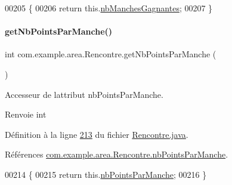\begin{DoxyCode}
00205     \{
00206         \textcolor{keywordflow}{return} this.\hyperlink{classcom_1_1example_1_1area_1_1_rencontre_aef266bd256aecd70fbd02cf07625ed14}{nbManchesGagnantes};
00207     \}
\end{DoxyCode}
\mbox{\label{classcom_1_1example_1_1area_1_1_rencontre_a539e26b8c59998880fcf9b7c9f2b685a}} 
\paragraph{\texorpdfstring{get\+Nb\+Points\+Par\+Manche()}{getNbPointsParManche()}}
{\footnotesize\ttfamily int com.\+example.\+area.\+Rencontre.\+get\+Nb\+Points\+Par\+Manche (\begin{DoxyParamCaption}{ }\end{DoxyParamCaption})}



Accesseur de l\textquotesingle{}attribut nb\+Points\+Par\+Manche. 

\begin{DoxyReturn}{Renvoie}
int 
\end{DoxyReturn}


Définition à la ligne \hyperlink{_rencontre_8java_source_l00213}{213} du fichier \hyperlink{_rencontre_8java_source}{Rencontre.\+java}.



Références \hyperlink{_rencontre_8java_source_l00027}{com.\+example.\+area.\+Rencontre.\+nb\+Points\+Par\+Manche}.


\begin{DoxyCode}
00214     \{
00215         \textcolor{keywordflow}{return} this.\hyperlink{classcom_1_1example_1_1area_1_1_rencontre_ae1849c4bcdcfbb2d336b750a36be1162}{nbPointsParManche};
00216     \}
\end{DoxyCode}
\mbox{\label{classcom_1_1example_1_1area_1_1_rencontre_a58b62bd2f8a63f532df2bc8607268a2d}} 
